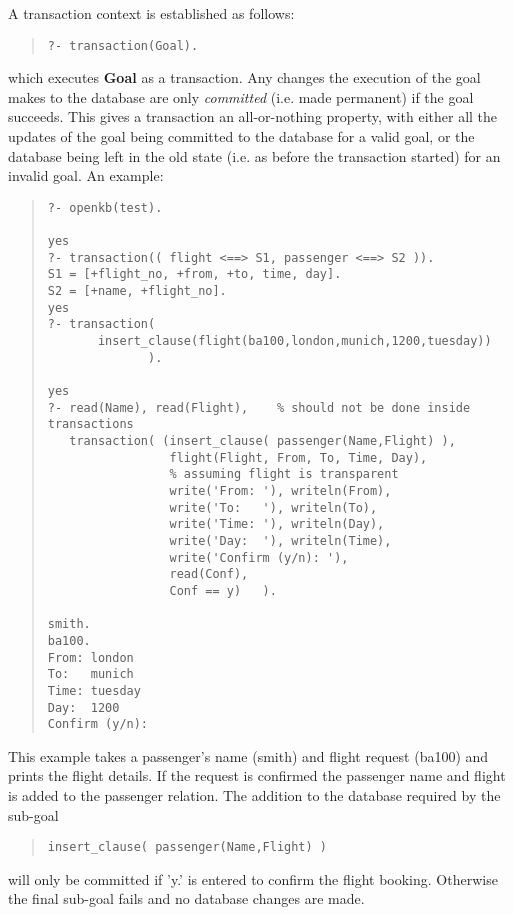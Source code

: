 A transaction context is established as follows:
\begin{quote}\begin{verbatim}
?- transaction(Goal).
\end{verbatim}\end{quote}
which executes {\bf Goal} as a transaction. Any changes the execution of
the goal makes to the database are only {\em committed} (i.e.
made permanent) if the goal succeeds. This 
gives a transaction an all-or-nothing property,
with either all the updates of the goal being committed to the database for
a valid goal, or the database being left in
the old state (i.e. as before the transaction started)
for an invalid goal. An example:

\begin{quote}\begin{verbatim}
?- openkb(test).

yes
?- transaction(( flight <==> S1, passenger <==> S2 )).
S1 = [+flight_no, +from, +to, time, day].
S2 = [+name, +flight_no].
yes
?- transaction(
       insert_clause(flight(ba100,london,munich,1200,tuesday))
              ).

yes
?- read(Name), read(Flight),	% should not be done inside transactions
   transaction( (insert_clause( passenger(Name,Flight) ),
                 flight(Flight, From, To, Time, Day),  
                 % assuming flight is transparent
                 write('From: '), writeln(From), 
                 write('To:   '), writeln(To), 
                 write('Time: '), writeln(Day), 
                 write('Day:  '), writeln(Time), 
                 write('Confirm (y/n): '),
                 read(Conf), 
                 Conf == y)   ). 

smith.
ba100.
From: london
To:   munich
Time: tuesday
Day:  1200
Confirm (y/n):
\end{verbatim}\end{quote}
This example takes a passenger's name (smith) and flight request
(ba100) and prints the flight details.  If the request is confirmed
the passenger name and flight is added to the passenger relation.
The addition to the database required by the sub-goal 
\begin{quote}\begin{verbatim}
insert_clause( passenger(Name,Flight) )
\end{verbatim}\end{quote}
 will only be committed if 'y.' is entered to confirm the flight booking.  
Otherwise the final sub-goal fails and no database changes are made.

